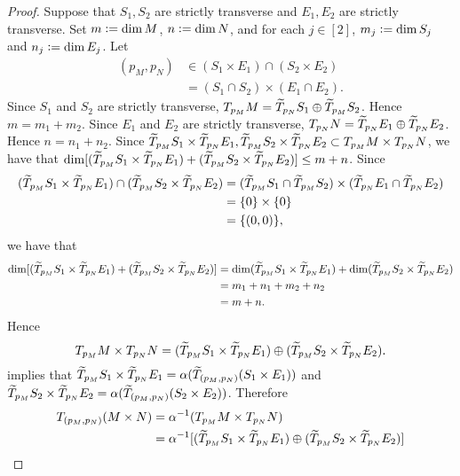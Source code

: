 \documentclass{book}
\begin{document}
	\begin{proof}
		Suppose that $S_1, S_2$ are strictly transverse and $E_1, E_2$ are strictly transverse. Set $m \vcentcolon= \dim M$, $n \vcentcolon= \dim N$, and for each $j \in [2]$, $m_j \vcentcolon= \dim S_j$ and $n_j \vcentcolon= \dim E_j$. Let 
		\begin{align*}
			(p_M, p_N) 
			& \in (S_1 \times E_1) \cap (S_2 \times E_2) \\
			& = (S_1 \cap S_2) \times (E_1 \cap E_2).
		\end{align*}
		Since $S_1$ and $S_2$ are strictly transverse, $T_{p_M} M = \widetilde{T}_{p_N}S_1 \oplus \widetilde{T}_{p_M} S_2$. Hence $m = m_1 + m_2$. Since $E_1$ and $E_2$ are strictly transverse, $T_{p_N} N = \widetilde{T}_{p_N} E_1 \oplus \widetilde{T}_{p_N} E_2$. Hence $n = n_1 + n_2$. Since $\widetilde{T}_{p_M} S_1 \times \widetilde{T}_{p_N} E_1, \widetilde{T}_{p_M} S_2 \times \widetilde{T}_{p_N} E_2 \subset T_{p_M} M \times T_{p_N} N $, we have that $\dim [(\widetilde{T}_{p_M} S_1 \times \widetilde{T}_{p_N} E_1) + (\widetilde{T}_{p_M} S_2 \times \widetilde{T}_{p_N} E_2)] \leq m + n$. Since 
		\begin{align*}
			(\widetilde{T}_{p_M} S_1 \times \widetilde{T}_{p_N} E_1) \cap (\widetilde{T}_{p_M} S_2 \times \widetilde{T}_{p_N} E_2 ) 
			& = (\widetilde{T}_{p_M} S_1 \cap \widetilde{T}_{p_M} S_2) \times (\widetilde{T}_{p_N} E_1 \cap \widetilde{T}_{p_N} E_2) \\
			& = \{0\} \times \{0\} \\
			& = \{(0,0)\},
		\end{align*}
		we have that 
		\begin{align*}
			\dim [(\widetilde{T}_{p_M} S_1 \times \widetilde{T}_{p_N} E_1) + (\widetilde{T}_{p_M} S_2 \times \widetilde{T}_{p_N} E_2 ) ] 
			& = \dim (\widetilde{T}_{p_M} S_1 \times \widetilde{T}_{p_N} E_1) + \dim (\widetilde{T}_{p_M} S_2 \times \widetilde{T}_{p_N} E_2 ) \\
			& = m_1 + n_1 + m_2 + n_2 \\
			& = m + n.
		\end{align*}
		Hence 
		$$T_{p_M}M \times T_{p_N}N = (\widetilde{T}_{p_M} S_1 \times \widetilde{T}_{p_N} E_1) \oplus (\widetilde{T}_{p_M} S_2 \times \widetilde{T}_{p_N} E_2 ).$$
		 implies that $\widetilde{T}_{p_M}S_1 \times \widetilde{T}_{p_N}E_1 = \alpha (\widetilde{T}_{(p_M, p_N)} (S_1 \times E_1))$ and $\widetilde{T}_{p_M}S_2 \times \widetilde{T}_{p_N}E_2 = \alpha (\widetilde{T}_{(p_M, p_N)} (S_2 \times E_2))$. Therefore
		\begin{align*}
			T_{(p_M, p_N)}(M \times N)
			& = \al^{-1}(T_{p_M}M \times T_{p_N}N) \\
			& = \al^{-1}[(\wt{T}_{p_M} S_1 \times \wt{T}_{p_N} E_1) \oplus (\wt{T}_{p_M} S_2 \times \wt{T}_{p_N} E_2 )] \\

\end{align*}
\end{proof}
\end{document}

